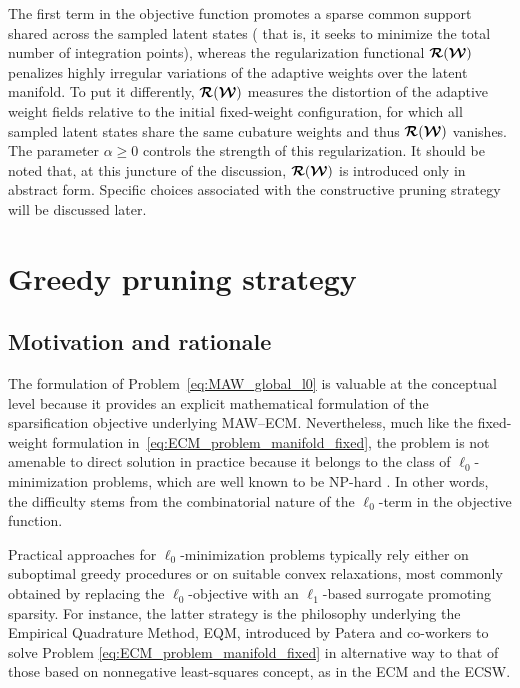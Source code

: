 \documentclass[11pt,a4paper]{article}
\newcommand{\PROMPT}[1]{ }
\begin{document}
The first term in the objective function promotes a sparse common support shared
across the sampled latent states ( that is, it seeks to minimize the total
number of integration points), whereas the regularization
functional \(\boldsymbol{\mathcal{R}}(\boldsymbol{\mathcal{W}})\) penalizes highly irregular variations of the adaptive
weights over the latent manifold. To put it differently, \(\boldsymbol{\mathcal{R}}(\boldsymbol{\mathcal{W}})\) measures the distortion of the adaptive
weight fields relative to the initial fixed-weight configuration, for which all
sampled latent states share the same cubature weights and thus  \(\boldsymbol{\mathcal{R}}(\boldsymbol{\mathcal{W}})\) vanishes. The parameter \(\alpha\ge0\) controls the
strength of this regularization.  It should be noted that,  at this juncture of the discussion, \(\boldsymbol{\mathcal{R}}(\boldsymbol{\mathcal{W}})\)
is introduced only in abstract form.  Specific choices associated with the
constructive pruning strategy will be discussed later.

\section{Greedy pruning strategy}

\subsection{Motivation and rationale}


%

The formulation of Problem~\eqref{eq:MAW_global_l0} is valuable at the conceptual level because it
provides an explicit mathematical formulation of the
sparsification objective underlying MAW--ECM.  Nevertheless, much like the fixed-weight formulation
in~\eqref{eq:ECM_problem_manifold_fixed}, the problem is not amenable to direct
solution in practice because it belongs to the class of
\(\ell_0\)-minimization problems, which are well known to be NP-hard
\cite{natarajan1995sparse}. In other words, the difficulty stems from the
combinatorial nature of the \(\ell_0\)-term in the objective function.




Practical approaches for \(\ell_0\)-minimization problems typically rely either on suboptimal greedy
procedures or on suitable convex relaxations, most commonly obtained by
replacing the \(\ell_0\)-objective with an \(\ell_1\)-based surrogate
promoting sparsity. For instance,  the latter strategy is   the philosophy underlying the Empirical Quadrature Method, EQM, introduced by Patera and co-workers
\cite{yano2019discontinuous,yano2019lp} to solve Problem   \eqref{eq:ECM_problem_manifold_fixed} in alternative way to that of those based on nonnegative least-squares concept, as in the ECM  and the ECSW.
\end{document}
